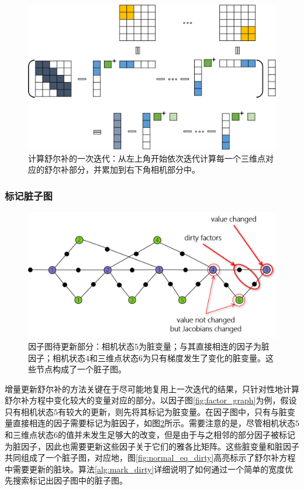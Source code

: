 \begin{figure}[htb!]
    \centering
    \includegraphics[width=\textwidth]{figs/schur_complement.png}
    \caption{计算舒尔补的一次迭代：从左上角开始依次迭代计算每一个三维点对应的舒尔补部分，并累加到右下角相机部分中。}
    \label{fig:schur_complement}
\end{figure}

\subsubsection*{标记脏子图}

\begin{figure}[htb!]
    \centering
    \includegraphics[width=.8\textwidth]{figs/factor_graph_dirty.png}
    \caption{因子图待更新部分：相机状态$5$为脏变量；与其直接相连的因子为脏因子；相机状态$4$和三维点状态$6$为只有梯度发生了变化的脏变量。这些节点构成了一个脏子图。}
    \label{fig:factor_graph_dirty}
\end{figure}

增量更新舒尔补的方法关键在于尽可能地复用上一次迭代的结果，只针对性地计算舒尔补方程中变化较大的变量对应的部分。以因子图\ref{fig:factor_graph}为例，假设只有相机状态$5$有较大的更新，则先将其标记为脏变量。在因子图中，只有与脏变量直接相连的因子需要标记为脏因子，如图\ref{fig:factor_graph_dirty}所示。需要注意的是，尽管相机状态$5$和三维点状态$6$的值并未发生足够大的改变，但是由于与之相邻的部分因子被标记为脏因子，因此也需要更新这些因子关于它们的雅各比矩阵。这些脏变量和脏因子共同组成了一个脏子图，对应地，图\ref{fig:normal_eq_dirty}高亮标示了舒尔补方程中需要更新的脏块。算法\ref{alg:mark_dirty}详细说明了如何通过一个简单的宽度优先搜索标记出因子图中的脏子图。

